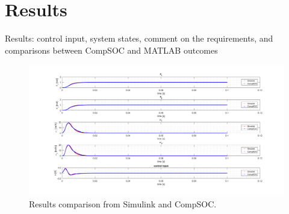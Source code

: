 \section{Results}


\color{red}
Results:	control	input,	system	states,	comment	on	the	requirements,	and	comparisons	
between	CompSOC and	MATLAB	outcomes
\color{black}


\begin{figure}[h]
	\begin{center}
		\includegraphics[width=\linewidth]{img/finalresult}
		\caption{Results comparison from Simulink and CompSOC.}
		\label{fig:finalresult}
	\end{center}
\end{figure}
